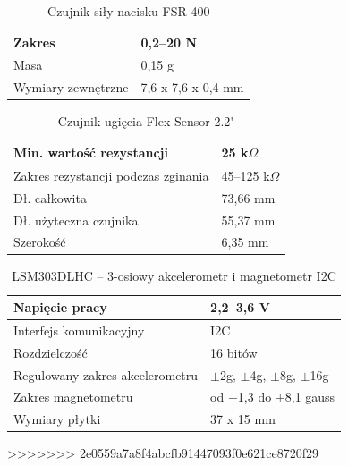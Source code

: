 \documentclass[12pt,a4paper]{article}
\begin{document}
\begin{table}[h]
\centering
\begin{tabularx}
{\textwidth}{ |X|X| }
\hline
Zakres & 0,2--20 N \\
\hline
Masa & 0,15 g \\ 
\hline
Wymiary zewnętrzne & 7,6 x 7,6 x 0,4 mm \\
\hline
\end{tabularx}
\caption{Czujnik siły nacisku FSR-400}
\end{table}


\begin{table}[h]
\centering
\begin{tabularx}
{\textwidth}{ |X|X| }
\hline
Min. wartość rezystancji & 25 k$\Omega$ \\
\hline
Zakres rezystancji podczas zginania & 45--125 k$\Omega$ \\
\hline
Dł. całkowita & 73,66 mm \\
\hline
Dł. użyteczna czujnika & 55,37 mm \\ 
\hline
Szerokość & 6,35 mm \\
\hline
\end{tabularx}
\caption{Czujnik ugięcia Flex Sensor 2.2"}
\end{table}


\begin{table}[h]
\centering
\begin{tabularx}
{\textwidth}{ |X|X| }
\hline
Napięcie pracy & 2,2--3,6 V \\
\hline
Interfejs komunikacyjny & I2C \\
\hline
Rozdzielczość & 16 bitów \\
\hline
Regulowany zakres akcelerometru &  $\pm$2g, $\pm$4g, $\pm$8g, $\pm$16g \\ 
\hline
Zakres magnetometru &  od $\pm$1,3 do $\pm$8,1 gauss \\ 
\hline
Wymiary płytki & 37 x 15 mm \\
\hline
\end{tabularx}
\caption{LSM303DLHC -- 3-osiowy akcelerometr i magnetometr I2C}
\end{table}


>>>>>>> 2e0559a7a8f4abcfb91447093f0e621ce8720f29
\end{document}

